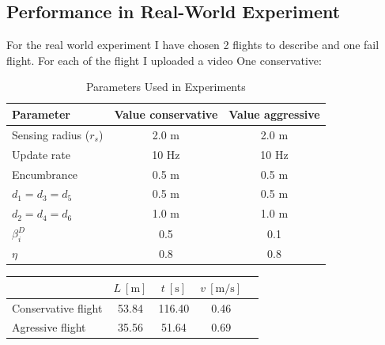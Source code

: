         
        \subsection{Performance in Real-World Experiment}
            For the real world experiment I have chosen 2 flights to describe and one fail flight. For each of the flight I uploaded a video One conservative:
            \begin{table}[H]
                \centering
                \caption{Parameters Used in Experiments}
                \begin{tabular}{|l|c|c|}
                    \hline
                    Parameter & Value conservative & Value aggressive \\
                    \hline
                    \hline
                    Sensing radius ($r_s$) & 2.0 m & 2.0 m \\ \hline
                    Update rate & 10 Hz & 10 Hz \\ \hline
                    Encumbrance & 0.5 m & 0.5 m \\ \hline
                    $d_1 = d_3 = d_5$ & 0.5 m & 0.5 m \\ \hline
                    $d_2 = d_4 = d_6$ & 1.0 m & 1.0 m\\ \hline
                    $\beta_i^D$ & 0.5 & 0.1 \\ \hline
                    $\eta$ & 0.8 & 0.8 \\ \hline
                \end{tabular}
                \label{tab:rbl_forest_conservative_flight}
            \end{table}

            \begin{table}[H]
                \centering
                \renewcommand{\arraystretch}{1.2}
                \begin{tabular}{|l|c|c|c|c|}
                \hline
                                    & \( L \ [\mathrm{m}] \) & \( t \ [\mathrm{s}] \) &  \( v \ [\mathrm{m/s}] \)     \\ \hline
                Conservative flight & 53.84                   & 116.40                  &  0.46                          \\ \hline
                Agressive flight    & 35.56                   &  51.64                  &  0.69                          \\ \hline
                \end{tabular}
            \end{table}

